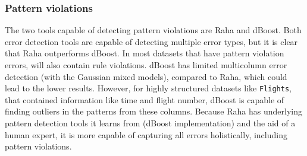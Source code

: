 

\subsubsection{Pattern violations}
The two tools capable of detecting pattern violations are Raha and dBoost. Both error detection tools are capable of detecting multiple error types, but it is clear that Raha outperforms dBoost. In most datasets that have pattern violation errors, will also contain rule violations. dBoost has limited multicolumn error detection (with the Gaussian mixed models), compared to Raha, which could lead to the lower results. However, for highly structured datasets like \verb|Flights|, that contained information like time and flight number, dBoost is capable of finding outliers in the patterns from these columns.
Because Raha has underlying pattern detection tools it learns from (dBoost implementation) and the aid of a human expert, it is more capable of capturing all errors holistically, including pattern violations.

